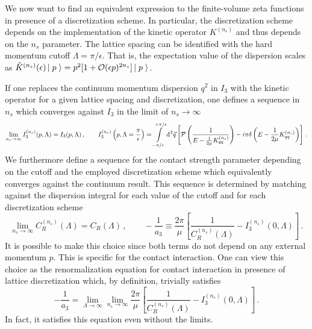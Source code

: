 We now want to find an equivalent expression to the finite-volume zeta functions in presence of a discretization scheme.
In particular, the discretization scheme depends on the implementation of the kinetic operator $K^{(n_s)}$ and thus depends on the $n_s$ parameter.
The lattice spacing can be identified with the hard momentum cutoff $\Lambda = \pi / \epsilon$.
That is, the expectation value of the dispersion scales as $\hat K^{(n_s)}(\epsilon) \left|\;p\;\right\rangle = p^2 [1 + \mathcal O(\epsilon p)^{2 n_s}]\left|\;p\;\right\rangle$.

If one replaces the continuum momentum dispersion $q^2$ in $I_3$ with the kinetic operator for a given lattice spacing and discretization, one defines a sequence in $n_s$ which converges against $I_3$ in the limit of $n_s \to \infty$
\begin{equation}
	\lim\limits_{n_s \to \infty} I^{(n_s)}_3(p, \Lambda) = I_3(p, \Lambda)
	\, , \qquad
	I^{(n_s)}_3\left(p, \Lambda=\frac{\pi}{\epsilon} \right)
	=
	    \int\limits_{-\pi/\epsilon}^{+\pi/\epsilon}
        \mathrm{d}^3 \vec{q}
        \left[
            \mathcal{P} \left(
                \frac{1}{
                    E - \frac{1}{2\mu} K_{qq}^{(n_s)} }
                \right)
            -i \pi \delta\left(E - \frac{1}{2\mu}K_{qq}^{(n_s)}\right)
        \right]
        \, .
\end{equation}
We furthermore define a sequence for the contact strength parameter depending on the cutoff and the employed discretization scheme which equivalently converges against the continuum result.
This sequence is determined by matching against the dispersion integral for each value of the cutoff and for each discretization scheme
\begin{equation}\label{eq:dispersion-renormalization}
	\lim\limits_{n_s \to \infty} C^{(n_s)}_R(\Lambda) = C_R(\Lambda) \, ,
	\qquad
	- \frac{1}{a_3}
	\equiv
	\frac{2 \pi}{\mu}
		\left[
		\frac{1}{C_R^{(n_s)}(\Lambda)} - I_3^{(n_s)}(0, \Lambda)
		\right]
	\, .
\end{equation}
It is possible to make this choice since both terms do not depend on any external momentum $p$.
This is specific for the contact interaction.
One can view this choice as the renormalization equation for contact interaction in presence of lattice discretization which, by definition, trivially satisfies
\begin{equation}
	- \frac{1}{a_3}
	=
	\lim\limits_{\Lambda \to \infty} \lim\limits_{n_s \to \infty}
	\frac{2 \pi}{\mu}
		\left[
		\frac{1}{C_R^{(n_s)}(\Lambda)} - I_3^{(n_s)}(0, \Lambda)
		\right]
	\, .
\end{equation}
In fact, it satisfies this equation even without the limits.


